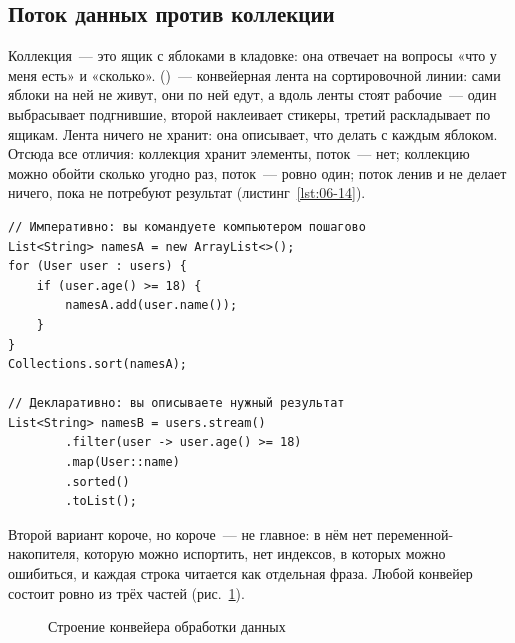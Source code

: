 \subsection{Поток данных против коллекции}

Коллекция~--- это ящик с яблоками в кладовке: она отвечает на вопросы «что у
меня есть» и «сколько».  ()~--- конвейерная лента на
сортировочной линии: сами яблоки на ней не живут, они по ней едут, а вдоль
ленты стоят рабочие~--- один выбрасывает подгнившие, второй наклеивает
стикеры, третий раскладывает по ящикам. Лента ничего не хранит: она описывает,
что делать с каждым яблоком. Отсюда все отличия: коллекция хранит элементы,
поток~--- нет; коллекцию можно обойти сколько угодно раз, поток~--- ровно
один; поток ленив и не делает ничего, пока не потребуют результат
(листинг~\ref{lst:06-14}).

\begin{listing}[H]
\begin{verbatim}
// Императивно: вы командуете компьютером пошагово
List<String> namesA = new ArrayList<>();
for (User user : users) {
    if (user.age() >= 18) {
        namesA.add(user.name());
    }
}
Collections.sort(namesA);

// Декларативно: вы описываете нужный результат
List<String> namesB = users.stream()
        .filter(user -> user.age() >= 18)
        .map(User::name)
        .sorted()
        .toList();
\end{verbatim}
\caption{Императивный и декларативный стиль}
\label{lst:06-14}
\end{listing}

Второй вариант короче, но короче~--- не главное: в нём нет
переменной-накопителя, которую можно испортить, нет индексов, в которых можно
ошибиться, и каждая строка читается как отдельная фраза. Любой конвейер
состоит ровно из трёх частей (рис.~\ref{fig:06-3}).

\begin{figure}[htbp]\centering
{}
\caption{Строение конвейера обработки данных}\label{fig:06-3}
\end{figure}

